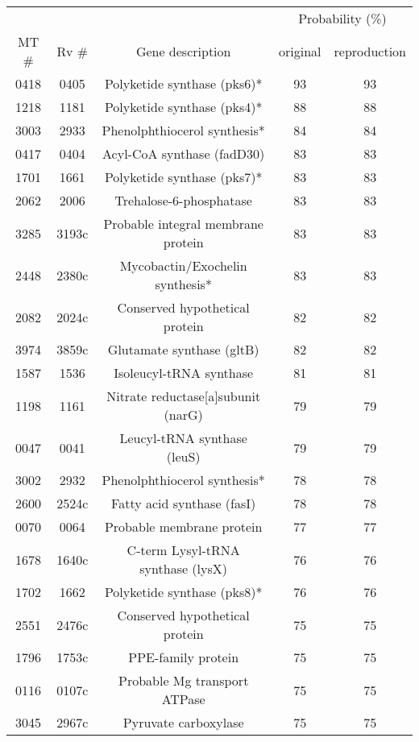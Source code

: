 \begin{tabular}{ccccc}
  \hline
  & & & \multicolumn{2}{c}{Probability (\%)}\\ MT \# & Rv \# & Gene description & original & reproduction\\ \hline
0418 & 0405 & Polyketide synthase (pks6)*  & 93 & 93 \\ 
  1218 & 1181 & Polyketide synthase  (pks4)*  & 88 & 88 \\ 
  3003 & 2933 & Phenolphthiocerol synthesis*  & 84 & 84 \\ 
  0417 & 0404 & Acyl-CoA synthase (fadD30) & 83 & 83 \\ 
  1701 & 1661 & Polyketide synthase (pks7)*  & 83 & 83 \\ 
  2062 & 2006 & Trehalose-6-phosphatase & 83 & 83 \\ 
  3285 & 3193c & Probable integral membrane protein & 83 & 83 \\ 
  2448 & 2380c & Mycobactin/Exochelin synthesis*  & 83 & 83 \\ 
  2082 & 2024c & Conserved hypothetical protein & 82 & 82 \\ 
  3974 & 3859c & Glutamate synthase (gltB) & 82 & 82 \\ 
  1587 & 1536 & Isoleucyl-tRNA synthase & 81 & 81 \\ 
  1198 & 1161 & Nitrate reductase[a]subunit (narG) & 79 & 79 \\ 
  0047 & 0041 & Leucyl-tRNA synthase (leuS) & 79 & 79 \\ 
  3002 & 2932 & Phenolphthiocerol synthesis*  & 78 & 78 \\ 
  2600 & 2524c & Fatty acid synthase (fasI) & 78 & 78 \\ 
  0070 & 0064 & Probable membrane protein & 77 & 77 \\ 
  1678 & 1640c & C-term Lysyl-tRNA synthase (lysX) & 76 & 76 \\ 
  1702 & 1662 & Polyketide synthase (pks8)*  & 76 & 76 \\ 
  2551 & 2476c & Conserved hypothetical protein & 75 & 75 \\ 
  1796 & 1753c & PPE-family protein & 75 & 75 \\ 
  0116 & 0107c & Probable Mg transport ATPase & 75 & 75 \\ 
  3045 & 2967c & Pyruvate carboxylase & 75 & 75 \\ 
   \hline
\end{tabular}
